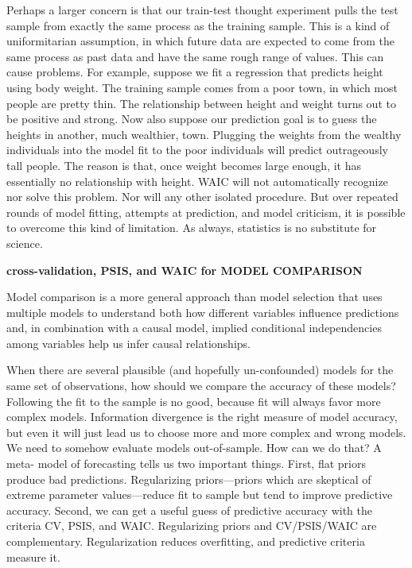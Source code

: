 \documentclass[
]{article}
\begin{document}
Perhaps a larger concern is that our train-test thought experiment pulls
the test sample from exactly the same process as the training sample.
This is a kind of uniformitarian assumption, in which future data are
expected to come from the same process as past data and have the same
rough range of values. This can cause problems. For example, suppose we
fit a regression that predicts height using body weight. The training
sample comes from a poor town, in which most people are pretty thin. The
relationship between height and weight turns out to be positive and
strong. Now also suppose our prediction goal is to guess the heights in
another, much wealthier, town. Plugging the weights from the wealthy
individuals into the model fit to the poor individuals will predict
outrageously tall people. The reason is that, once weight becomes large
enough, it has essentially no relationship with height. WAIC will not
automatically recognize nor solve this problem. Nor will any other
isolated procedure. But over repeated rounds of model fitting, attempts
at prediction, and model criticism, it is possible to overcome this kind
of limitation. As always, statistics is no substitute for science.

\textbf{cross-validation, PSIS, and WAIC for MODEL COMPARISON}

Model comparison is a more general approach than model selection that
uses multiple models to understand both how different variables
influence predictions and, in combination with a causal model, implied
conditional independencies among variables help us infer causal
relationships.

When there are several plausible (and hopefully un-confounded) models
for the same set of observations, how should we compare the accuracy of
these models? Following the fit to the sample is no good, because fit
will always favor more complex models. Information divergence is the
right measure of model accuracy, but even it will just lead us to choose
more and more complex and wrong models. We need to somehow evaluate
models out-of-sample. How can we do that? A meta- model of forecasting
tells us two important things. First, flat priors produce bad
predictions. Regularizing priors---priors which are skeptical of extreme
parameter values---reduce fit to sample but tend to improve predictive
accuracy. Second, we can get a useful guess of predictive accuracy with
the criteria CV, PSIS, and WAIC. Regularizing priors and CV/PSIS/WAIC
are complementary. Regularization reduces overfitting, and predictive
criteria measure it.
\end{document}

